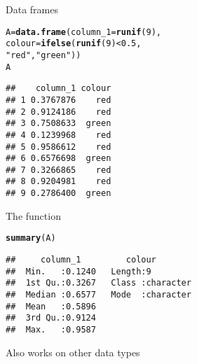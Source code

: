 \documentclass[aspectratio=169]{beamer}\usepackage[]{graphicx}\usepackage[]{xcolor}
\makeatletter
\newcommand{\hlnum}[1]{\textcolor[rgb]{0.686,0.059,0.569}{#1}}%
\newcommand{\hlsng}[1]{\textcolor[rgb]{0.192,0.494,0.8}{#1}}%
\newcommand{\hlopt}[1]{\textcolor[rgb]{0,0,0}{#1}}%
\newcommand{\hldef}[1]{\textcolor[rgb]{0.345,0.345,0.345}{#1}}%
\newcommand{\hlkwb}[1]{\textcolor[rgb]{0.69,0.353,0.396}{#1}}%
\newcommand{\hlkwc}[1]{\textcolor[rgb]{0.333,0.667,0.333}{#1}}%
\newcommand{\hlkwd}[1]{\textcolor[rgb]{0.737,0.353,0.396}{\textbf{#1}}}%
\newenvironment{kframe}{%
 \def\at@end@of@kframe{}%
 \ifinner\ifhmode%
  \def\at@end@of@kframe{\end{minipage}}%
  \begin{minipage}{\columnwidth}%
 \fi\fi%
 \def\FrameCommand##1{\hskip\@totalleftmargin \hskip-\fboxsep
 \colorbox{shadecolor}{##1}\hskip-\fboxsep
     \hskip-\linewidth \hskip-\@totalleftmargin \hskip\columnwidth}%
 \MakeFramed {\advance\hsize-\width
   \@totalleftmargin\z@ \linewidth\hsize
   \@setminipage}}%
 {\par\unskip\endMakeFramed%
 \at@end@of@kframe}
\newenvironment{knitrout}{}{} %
\makeatother
\begin{document}
\begin{frame}[fragile]{Data frames}
\begin{knitrout}
\color{fgcolor}\begin{kframe}
\begin{alltt}
\hldef{A} \hlkwb{=} \hlkwd{data.frame}\hldef{(}\hlkwc{column_1} \hldef{=} \hlkwd{runif}\hldef{(}\hlnum{9}\hldef{),}
               \hlkwc{colour} \hldef{=} \hlkwd{ifelse}\hldef{(}\hlkwd{runif}\hldef{(}\hlnum{9}\hldef{)} \hlopt{<} \hlnum{0.5}\hldef{,}
                               \hlsng{"red"}\hldef{,} \hlsng{"green"}\hldef{))}
\hldef{A}
\end{alltt}
\begin{verbatim}
##    column_1 colour
## 1 0.3767876    red
## 2 0.9124186    red
## 3 0.7508633  green
## 4 0.1239968    red
## 5 0.9586612    red
## 6 0.6576698  green
## 7 0.3266865    red
## 8 0.9204981    red
## 9 0.2786400  green
\end{verbatim}
\end{kframe}
\end{knitrout}
\end{frame}
  
\begin{frame}[fragile]{The  function}
\begin{knitrout}
\color{fgcolor}\begin{kframe}
\begin{alltt}
\hlkwd{summary}\hldef{(A)}
\end{alltt}
\begin{verbatim}
##     column_1         colour         
##  Min.   :0.1240   Length:9          
##  1st Qu.:0.3267   Class :character  
##  Median :0.6577   Mode  :character  
##  Mean   :0.5896                     
##  3rd Qu.:0.9124                     
##  Max.   :0.9587
\end{verbatim}
\end{kframe}
\end{knitrout}
\vfill
Also works on other data types
\end{frame}
\end{document}
